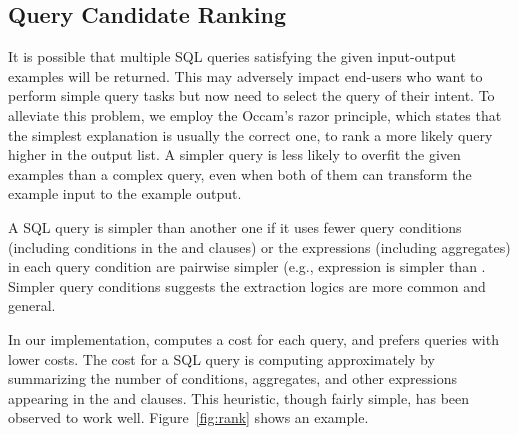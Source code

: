 \subsection{Query Candidate Ranking}
\label{sec:ranking}


It is possible that multiple SQL queries satisfying
the given input-output examples will be returned.
This may adversely impact end-users who want to
perform simple query tasks but now need
to select the query of their intent.
To alleviate this problem, we employ
the Occam's razor principle, which states that the
simplest explanation is usually the correct one, to
rank a more likely query higher in the output list.
A simpler query is less likely to overfit the given examples
than a complex query, even when both of them
can transform the example input to the example output.


A SQL query is simpler than another one if it uses
fewer query conditions (including conditions in the 
and  clauses) or the expressions (including
aggregates) in each query condition are pairwise simpler
(e.g., expression  is simpler than
.
Simpler query conditions suggests the extraction logics
are more common and general.

In our implementation, \ourtool computes a cost for each
query, and prefers queries with lower costs. The cost
for a SQL query is computing approximately by summarizing
the number of conditions, aggregates,
and other expressions
appearing in the  and  clauses.
This heuristic, though fairly simple, has been observed
to work well.
Figure~\ref{fig:rank} shows an example.


